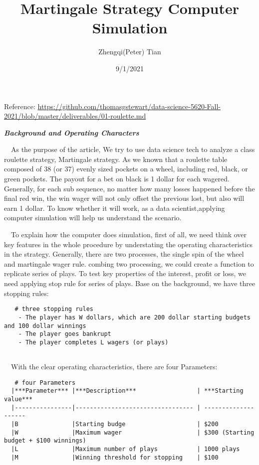 \documentclass[
]{article}
\title{Martingale Strategy Computer Simulation}
\author{Zhengqi(Peter) Tian}
\date{9/1/2021}
\begin{document}
\maketitle

Reference:
\url{https://github.com/thomasgstewart/data-science-5620-Fall-2021/blob/master/deliverables/01-roulette.md}

\textbf{\emph{Background and Operating Characters}}

 As the purpose of the article, We try to use data science tech to
analyze a class roulette strategy, Martingale strategy. As we known that
a roulette table composed of 38 (or 37) evenly sized pockets on a wheel,
including red, black, or green pockets. The payout for a bet on black is
1 dollar for each wagered. Generally, for each sub sequence, no matter
how many losses happened before the final red win, the win wager will
not only offset the previous lost, but also will earn 1 dollar. To know
whether it will work, as a data scientist,applying computer simulation
will help us understand the scenario.

 To explain how the computer does simulation, first of all, we need
think over key features in the whole procedure by understating the
operating characteristics in the strategy. Generally, there are two
processes, the single spin of the wheel and martingale wager rule.
combing two processing, we could create a function to replicate series
of plays. To test key properties of the interest, profit or loss, we
need applying stop rule for series of plays. Base on the background, we
have three stopping rules:

\begin{verbatim}
   # three stopping rules
    - The player has W dollars, which are 200 dollar starting budgets and 100 dollar winnings
    - The player goes bankrupt
    - The player completes L wagers (or plays)
  
\end{verbatim}

 With the clear operating characteristics, there are four Parameters:

\begin{verbatim}
   # four Parameters
  |***Parameter*** |***Description***                 | ***Starting value***
  |----------------|--------------------------------- | --------------------
  |B               |Starting budge                    | $200
  |W               |Maximum wager                     | $300 (Starting budget + $100 winnings)
  |L               |Maximum number of plays           | 1000 plays
  |M               |Winning threshold for stopping    | $100     
  
\end{verbatim}
\end{document}
